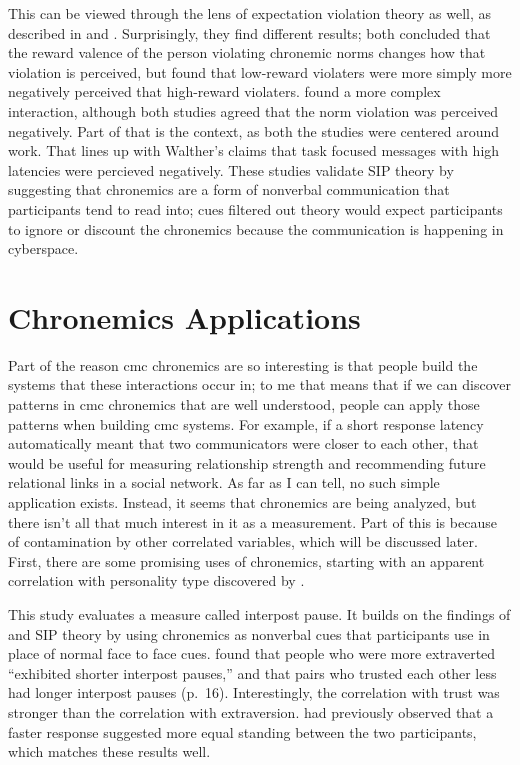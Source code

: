 \documentclass[
  stu]{apa7}
\begin{document}
This can be viewed through the lens of expectation violation theory as
well, as described in \textcite{kalman11} and \textcite{sheldon06}.
Surprisingly, they find different results; both concluded that the
reward valence of the person violating chronemic norms changes how that
violation is perceived, but \textcite{sheldon06} found that low-reward
violaters were more simply more negatively perceived that high-reward
violaters. \textcite{kalman11} found a more complex interaction,
although both studies agreed that the norm violation was perceived
negatively. Part of that is the context, as both the studies were
centered around work. That lines up with Walther's claims that task
focused messages with high latencies were percieved negatively. These
studies validate SIP theory by suggesting that chronemics are a form of
nonverbal communication that participants tend to read into; cues
filtered out theory would expect participants to ignore or discount the
chronemics because the communication is happening in cyberspace.

\hypertarget{chronemics-applications}{%
\section{Chronemics Applications}\label{chronemics-applications}}

Part of the reason cmc chronemics are so interesting is that people
build the systems that these interactions occur in; to me that means
that if we can discover patterns in cmc chronemics that are well
understood, people can apply those patterns when building cmc systems.
For example, if a short response latency automatically meant that two
communicators were closer to each other, that would be useful for
measuring relationship strength and recommending future relational links
in a social network. As far as I can tell, no such simple application
exists. Instead, it seems that chronemics are being analyzed, but there
isn't all that much interest in it as a measurement. Part of this is
because of contamination by other correlated variables, which will be
discussed later. First, there are some promising uses of chronemics,
starting with an apparent correlation with personality type discovered
by \textcite{kalman13}.

This study evaluates a measure called interpost pause. It builds on the
findings of \textcite{kalman11} and SIP theory by using chronemics as
nonverbal cues that participants use in place of normal face to face
cues. \textcite{kalman13} found that people who were more extraverted
``exhibited shorter interpost pauses,'' and that pairs who trusted each
other less had longer interpost pauses (p.~16). Interestingly, the
correlation with trust was stronger than the correlation with
extraversion. \textcite{walther95} had previously observed that a faster
response suggested more equal standing between the two participants,
which matches these results well.
\end{document}
